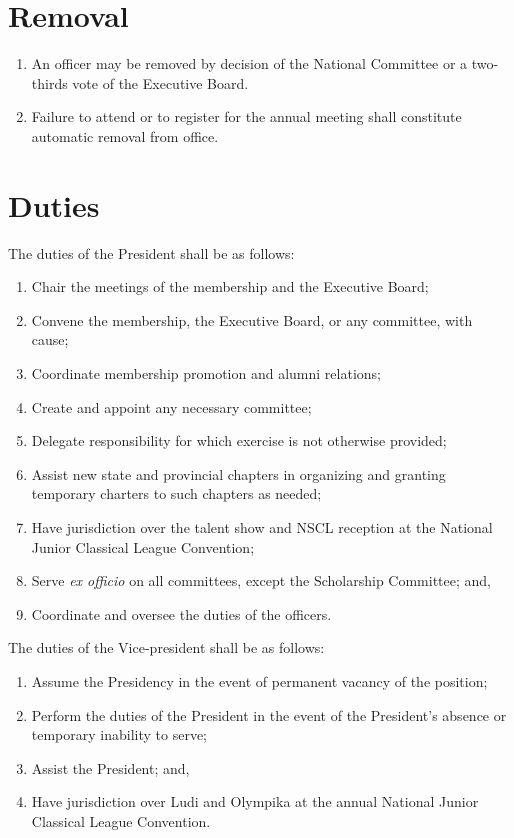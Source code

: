\documentclass{bylaws_nofont}
\newcommand{\NSCL}{\textsc{NSCL}\xspace}
\begin{document}
\begin{linenumbers}[1]
  \section{Removal}
  \begin{enumerate}
  \item An officer may be removed by decision of the National Committee
    or a two-thirds vote of the Executive Board.
  \item Failure to attend or to register for the annual meeting shall
    constitute automatic removal from office.\\
  \end{enumerate}

  \section{Duties} %
  \begin{enumerate}
    \sub[President] The duties of the President shall be as follows:
    \begin{enumerate}
    \item Chair the meetings of the membership and the Executive Board;
    \item Convene the membership, the Executive Board, or any committee,
      with cause;
    \item Coordinate membership promotion and alumni relations;
    \item Create and appoint any necessary committee;
    \item Delegate responsibility for which exercise is not otherwise
      provided;
    \item Assist new state and provincial chapters in organizing and
      granting temporary charters to such chapters as needed;
    \item Have jurisdiction over the talent show and \NSCL reception at
      the National Junior Classical League Convention;
    \item Serve \textit{ex officio} on all committees, except the
      Scholarship Committee; and,
    \item Coordinate and oversee the duties of the officers.
    \end{enumerate}
    
     The duties of the Vice-president shall be as
    follows:
    \begin{enumerate}
    \item Assume the Presidency in the event of permanent vacancy of the
      position;
    \item Perform the duties of the President in the event of the
      President's absence or temporary inability to serve;
    \item Assist the President; and,
    \item Have jurisdiction over Ludi and Olympika at the annual
      National Junior Classical League Convention.
    \end{enumerate}
    

\end{enumerate}
\end{linenumbers}
\end{document}
